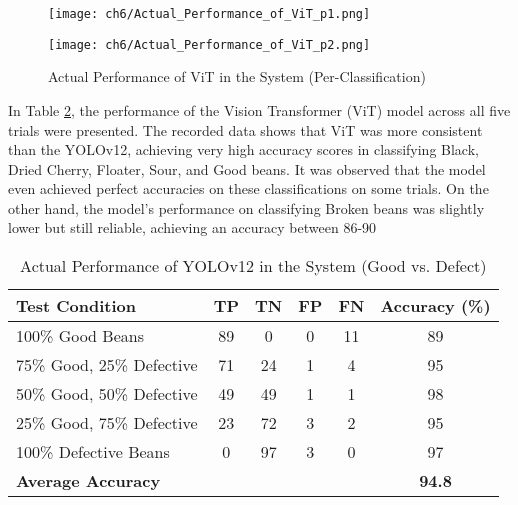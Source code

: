 \begin{figure}[H]
    \centering
    \texttt{[image: ch6/Actual\_Performance\_of\_ViT\_p1.png]}
    \label{fig:actual_performance_vit}
\end{figure}

\begin{figure}[H]
    \centering
    \texttt{[image: ch6/Actual\_Performance\_of\_ViT\_p2.png]}
    \caption{Actual Performance of ViT in the System (Per-Classification)}
    \label{fig:actual_performance_vit}
\end{figure}
In Table \ref{fig:actual_performance_vit}, the performance of the Vision Transformer (ViT) model across all five trials were presented. The recorded data shows that ViT was more consistent than the YOLOv12, achieving very high accuracy scores in classifying Black, Dried Cherry, Floater, Sour, and Good beans. It was observed that the model even achieved perfect accuracies on these classifications on some trials. On the other hand, the model’s performance on classifying Broken beans was slightly lower but still reliable, achieving an accuracy between 86-90%

\begin{table}[ht]
	\centering
	\small
	\caption{Actual Performance of YOLOv12 in the System (Good vs. Defect)}
	\begin{tabularx}{\linewidth}{@{}>{\raggedright}X c c c c c@{}}
	\toprule
	\textbf{Test Condition} & \textbf{TP} & \textbf{TN} & \textbf{FP} & \textbf{FN} & \textbf{Accuracy (\%)} \\
	\midrule
	100\% Good Beans & 89 & 0 & 0 & 11 & 89 \\
	75\% Good, 25\% Defective & 71 & 24 & 1 & 4 & 95 \\
	50\% Good, 50\% Defective & 49 & 49 & 1 & 1 & 98 \\
	25\% Good, 75\% Defective & 23 & 72 & 3 & 2 & 95 \\
	100\% Defective Beans & 0 & 97 & 3 & 0 & 97 \\
	\bottomrule
	\textbf{Average Accuracy} & & & & & \textbf{94.8} \\
	\end{tabularx}
	\label{tab:yolov12_good_defective}
\end{table}

